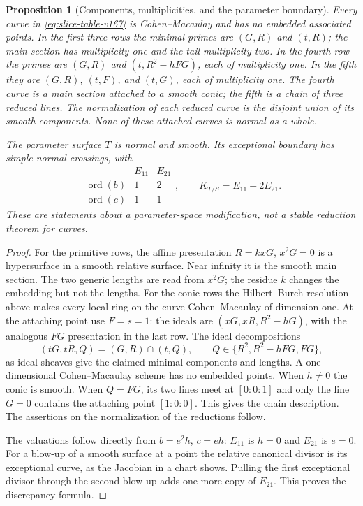 \documentclass[11pt,reqno]{amsart}
\numberwithin{equation}{section}
\newtheorem{proposition}[theorem]{Proposition}
\theoremstyle{definition}\newtheorem{definition}[theorem]{Definition}
\theoremstyle{remark}\newtheorem{remark}[theorem]{Remark}
\begin{document}
\begin{proposition}[Components, multiplicities, and the parameter boundary]
\label{prop:slice-geometry-v167}
Every curve in \eqref{eq:slice-table-v167} is Cohen--Macaulay and
has no embedded associated points. In the first three rows the
minimal primes are $(G,R)$ and $(t,R)$; the main section has
multiplicity one and the tail multiplicity two. In the fourth
row the primes are $(G,R)$ and $(t,R^2-hFG)$, each of multiplicity
one. In the fifth they are $(G,R)$, $(t,F)$, and $(t,G)$,
each of multiplicity one. The fourth curve is a main section
attached to a smooth conic; the fifth is a chain of three reduced
lines. The normalization of each reduced curve is the disjoint
union of its smooth components. None of these attached curves
is normal as a whole.

The parameter surface $T$ is normal and smooth. Its exceptional
boundary has simple normal crossings, with
\[
 \begin{array}{c|cc} &E_{11}&E_{21}\\ \hline
 \operatorname{ord}(b)&1&2\\
 \operatorname{ord}(c)&1&1
 \end{array},\qquad
 K_{T/S}=E_{11}+2E_{21}.
\]
These are statements about a parameter-space modification, not a
stable reduction theorem for curves.
\end{proposition}
\begin{proof}
For the primitive rows, the affine presentation
$R=kxG$, $x^2G=0$ is a hypersurface in a smooth relative surface.
Near infinity it is the smooth main section. The two generic
lengths are read from $x^2G$; the residue $k$ changes the
embedding but not the lengths. For the conic rows the
Hilbert--Burch resolution above makes every local ring on the
curve Cohen--Macaulay of dimension one. At the attaching point
use $F=s=1$: the ideals are $(xG,xR,R^2-hG)$, with the analogous
$FG$ presentation in the last row. The ideal decompositions
\[
 (tG,tR,Q)=(G,R)\cap(t,Q),\qquad Q\in\{R^2,R^2-hFG,FG\},
\]
as ideal sheaves give the claimed minimal components and lengths.
A one-dimensional Cohen--Macaulay scheme has no embedded points.
When $h\ne0$ the conic is smooth. When $Q=FG$, its two lines
meet at $[0:0:1]$ and only the line $G=0$ contains the attaching
point $[1:0:0]$. This gives the chain description. The assertions
on the normalization of the reductions follow.

The valuations follow directly from $b=e^2h$, $c=eh$:
$E_{11}$ is $h=0$ and $E_{21}$ is $e=0$. For a blow-up of a
smooth surface at a point the relative canonical divisor is its
exceptional curve, as the Jacobian in a chart shows. Pulling the
first exceptional divisor through the second blow-up adds one
more copy of $E_{21}$. This proves the discrepancy formula.
\end{proof}
\end{document}
